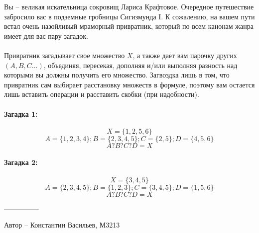 \question
Вы -- великая искательница сокровищ Лариса Крафтовое. Очередное путешествие забросило вас в подземные гробницы Сигизмунда I. К сожалению, на вашем пути встал очень назойливый мраморный привратник, который по всем канонам жанра имеет для вас пару загадок.
\\
\\
Привратник загадывает свое множество $X$, а также дает вам парочку других $(A,B,C…)$, объединяя, пересекая, дополняя и/или выполняя разность над которыми вы должны получить его множество. Загвоздка лишь в том, что привратник сам выбирает расстановку множеств в формуле, поэтому вам остается лишь вставить операции и расставить скобки (при надобности).

\paragraph{Загадка 1:}
\begin{equation*}
    X=\{1,2,5,6\}
\end{equation*}
\begin{equation*}
    A=\{1,2,3,4\}; B=\{2,3,4,5\}; C=\{2,5\}; D=\{4,5,6\}
    \end{equation*}
\begin{equation*}
    A ? B ? C ? D = X
\end{equation*}

\paragraph{Загадка 2:}
\begin{equation*}
    X=\{3,4,5\}
\end{equation*}
\begin{equation*}
    A=\{2,3,4,5\}; B=\{1,2,3\}; C=\{3,4,5\}; D=\{1,5,6\}
    \end{equation*}
\begin{equation*}
    A ? B ? C ? D = X
\end{equation*}

---------------

Автор -- Константин Васильев, М3213